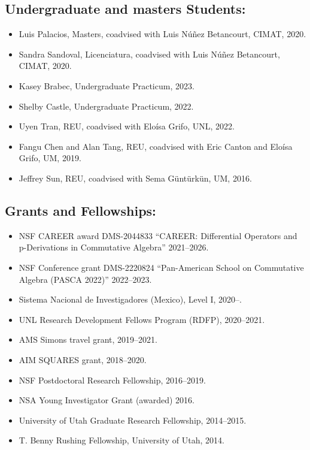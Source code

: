 \documentclass[12pt]{amsart}
\begin{document}
	
\subsection*{Undergraduate and masters Students:}
\begin{itemize}[leftmargin=9mm]
	\item Luis Palacios, Masters, coadvised with Luis N\'u\~nez Betancourt, CIMAT, 2020.
	\item Sandra Sandoval, Licenciatura, coadvised with Luis N\'u\~nez Betancourt, CIMAT, 2020.	
	\item Kasey Brabec, Undergraduate Practicum, 2023.
	\item Shelby Castle, Undergraduate Practicum, 2022.

	\item Uyen Tran, REU, coadvised with Elo\'isa Grifo, UNL, 2022.
	\item Fangu Chen and Alan Tang, REU, coadvised with Eric Canton and Elo\'isa Grifo, UM, 2019.
	\item Jeffrey Sun, REU, coadvised with Sema G\"unt\"urk\"un, UM, 2016.
\end{itemize}


\subsection*{Grants and Fellowships:}
\begin{itemize}[leftmargin=9mm]
	\item NSF CAREER award DMS-2044833 ``CAREER: Differential Operators and p-Derivations in Commutative Algebra'' 2021--2026.
	\item NSF Conference grant DMS-2220824 ``Pan-American School on Commutative Algebra (PASCA 2022)'' 2022--2023.
	\item Sistema Nacional de Investigadores (Mexico), Level I, 2020--.
	\item UNL Research Development Fellows Program (RDFP), 2020--2021.
	\item AMS Simons travel grant, 2019--2021.
	\item AIM SQUARES grant, 2018--2020.
	\item NSF Postdoctoral Research Fellowship, 2016--2019.
	\item NSA Young Investigator Grant (awarded) 2016.
	\item University of Utah Graduate Research Fellowship, 2014--2015.
	\item T. Benny Rushing Fellowship, University of Utah, 2014.
\end{itemize}
\end{document}
